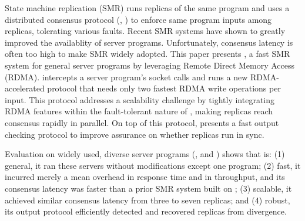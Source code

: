 

State machine replication (SMR) runs replicas of the same program and 
uses a distributed consensus protocol (\eg, \paxos) to enforce same program 
inputs among replicas, tolerating various faults. Recent SMR systems have shown 
to greatly improved the availablity of server programs. Unfortunately, consensus 
latency is often too high to make SMR widely adopted. This paper presents \xxx, 
a fast SMR system for general server programs by leveraging Remote Direct 
Memory Access (RDMA). \xxx intercepts a server program's socket calls and runs 
a new RDMA-accelerated \paxos protocol that needs only two fastest RDMA write 
operations per input. This protocol addresses a \paxos scalability challenge by 
tightly integrating RDMA features within the fault-tolerant nature of \paxos, 
making replicas reach consensus rapidly in parallel. On top of this protocol, 
\xxx presents a fast output checking protocol to improve assurance on whether 
replicas run in sync.


Evaluation on \nprog widely used, diverse server programs (\eg, \memcached and 
\mysql) shows that \xxx is: (1) general, it ran these servers 
without modifications except one program; (2) fast, it incurred merely a 
\latencyoverhead mean overhead in response time and \tputoverhead in 
throughput, and its consensus latency was \fasterthanzookeeper faster than 
a prior SMR system built on \zookeeper; (3) scalable, it achieved similar 
consensus latency from three to seven replicas; and (4) robust, its output 
protocol efficiently detected and recovered replicas from divergence.

